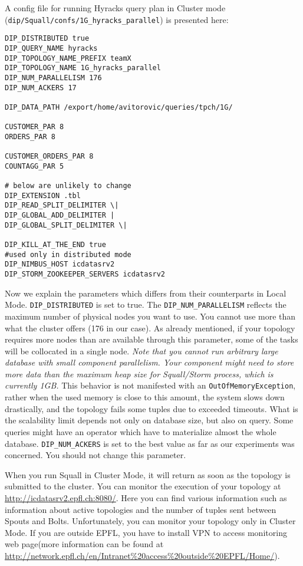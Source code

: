 \documentclass[a4paper,10pt]{article}
\begin{document}
A config file for running Hyracks query plan in Cluster mode \\(\verb#dip/Squall/confs/1G_hyracks_parallel#) is presented here:
\begin{verbatim}
DIP_DISTRIBUTED true
DIP_QUERY_NAME hyracks
DIP_TOPOLOGY_NAME_PREFIX teamX
DIP_TOPOLOGY_NAME 1G_hyracks_parallel
DIP_NUM_PARALLELISM 176
DIP_NUM_ACKERS 17

DIP_DATA_PATH /export/home/avitorovic/queries/tpch/1G/

CUSTOMER_PAR 8
ORDERS_PAR 8

CUSTOMER_ORDERS_PAR 8
COUNTAGG_PAR 5

# below are unlikely to change
DIP_EXTENSION .tbl
DIP_READ_SPLIT_DELIMITER \|
DIP_GLOBAL_ADD_DELIMITER |
DIP_GLOBAL_SPLIT_DELIMITER \|

DIP_KILL_AT_THE_END true
#used only in distributed mode
DIP_NIMBUS_HOST icdatasrv2
DIP_STORM_ZOOKEEPER_SERVERS icdatasrv2
\end{verbatim}

Now we explain the parameters which differs from their counterparts in Local Mode. \verb|DIP_DISTRIBUTED| is set to true. The \verb|DIP_NUM_PARALLELISM| reflects the maximum number of physical nodes you want to use. You cannot use more than what the cluster offers (176 in our case). As already mentioned, if your topology requires more nodes than are available through this parameter, some of the tasks will be collocated in a single node. \textit{Note that you cannot run arbitrary large database with small component parallelism. Your component might need to store more data than the maximum heap size for Squall/Storm process, which is currently 1GB.} This behavior is not manifested with an \verb|OutOfMemoryException|, rather when the used memory is close to this amount, the system slows down drastically, and the topology fails some tuples due to exceeded timeouts. What is the scalability limit depends not only on database size, but also on query. Some queries might have an operator which have to materialize almost the whole database. \verb|DIP_NUM_ACKERS| is set to the best value as far as our experiments was concerned. You should not change this parameter.

When you run Squall in Cluster Mode, it will return as soon as the topology is submitted to the cluster. You can monitor the execution of your topology at \url{http://icdatasrv2.epfl.ch:8080/}. Here you can find various information such as information about active topologies and the number of tuples sent between Spouts and Bolts. Unfortunately, you can monitor your topology only in Cluster Mode. If you are outside EPFL, you have to install VPN to access monitoring web page(more information can be found at \url{http://network.epfl.ch/en/Intranet\%20access\%20outside\%20EPFL/Home/}).
\end{document}
